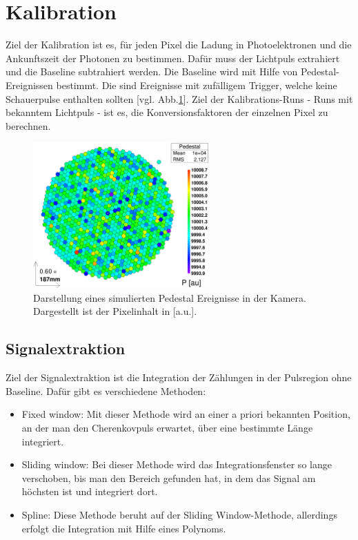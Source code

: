 \section{Kalibration}
\label{sec:Calibration}
Ziel der Kalibration ist es, für jeden Pixel die Ladung in Photoelektronen und die Ankunftszeit der Photonen zu bestimmen.
Dafür muss der Lichtpuls extrahiert und die Baseline subtrahiert werden.
Die Baseline wird mit Hilfe von Pedestal-Ereignissen bestimmt. 
Die sind Ereignisse mit zufälligem Trigger, welche keine Schauerpulse enthalten sollten [vgl. Abb.\ref{Kamera-Bild-Pedestal}].
Ziel der Kalibrations-Runs - Runs mit bekanntem Lichtpuls - ist es, die Konversionsfaktoren der einzelnen Pixel zu berechnen.

\begin{figure}
    \centering
    \includegraphics[width=0.6\textwidth]{./Plots/03_MonteCarlos/Pedestal_fertig.png}
    \caption{Darstellung eines simulierten Pedestal Ereignisse in der Kamera. Dargestellt ist der Pixelinhalt in [a.u.].}
    \label{Kamera-Bild-Pedestal}
\end{figure}


\subsection{Signalextraktion}
Ziel der Signalextraktion ist die Integration der Zählungen in der Pulsregion ohne Baseline.
Dafür gibt es verschiedene Methoden:
\begin{itemize}
 \item Fixed window: Mit dieser Methode wird an einer a priori bekannten Position, an der man den Cherenkovpuls erwartet, über eine bestimmte Länge integriert.
 \item Sliding window: Bei dieser Methode wird das Integrationsfenster so lange verschoben, bis man den Bereich gefunden hat, in dem das Signal am höchsten ist und integriert dort.
 \item Spline: Diese Methode beruht auf der Sliding Window-Methode, allerdings erfolgt die Integration mit Hilfe eines Polynoms.
\end{itemize}

